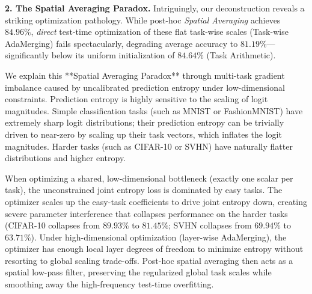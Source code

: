 \textbf{2. The Spatial Averaging Paradox.}
Intriguingly, our deconstruction reveals a striking optimization pathology. While post-hoc \emph{Spatial Averaging} achieves $84.96\%$, \emph{direct} test-time optimization of these flat task-wise scales (Task-wise AdaMerging) fails spectacularly, degrading average accuracy to $81.19\%$---significantly below its uniform initialization of $84.64\%$ (Task Arithmetic). 

We explain this **Spatial Averaging Paradox** through multi-task gradient imbalance caused by uncalibrated prediction entropy under low-dimensional constraints. Prediction entropy is highly sensitive to the scaling of logit magnitudes. Simple classification tasks (such as MNIST or FashionMNIST) have extremely sharp logit distributions; their prediction entropy can be trivially driven to near-zero by scaling up their task vectors, which inflates the logit magnitudes. Harder tasks (such as CIFAR-10 or SVHN) have naturally flatter distributions and higher entropy. 

When optimizing a shared, low-dimensional bottleneck (exactly one scalar per task), the unconstrained joint entropy loss is dominated by easy tasks. The optimizer scales up the easy-task coefficients to drive joint entropy down, creating severe parameter interference that collapses performance on the harder tasks (CIFAR-10 collapses from $89.93\%$ to $81.45\%$; SVHN collapses from $69.94\%$ to $63.71\%$). Under high-dimensional optimization (layer-wise AdaMerging), the optimizer has enough local layer degrees of freedom to minimize entropy without resorting to global scaling trade-offs. Post-hoc spatial averaging then acts as a spatial low-pass filter, preserving the regularized global task scales while smoothing away the high-frequency test-time overfitting.

